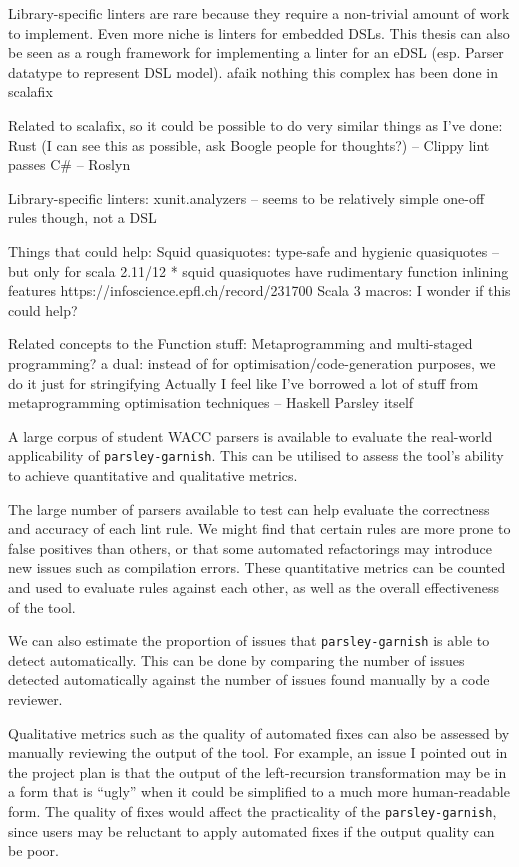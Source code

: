 \documentclass[../../main.tex]{subfiles}
\begin{document}
Library-specific linters are rare because they require a non-trivial amount of work to implement.
Even more niche is linters for embedded DSLs.
This thesis can also be seen as a rough framework for implementing a linter for an eDSL (esp. Parser datatype to represent DSL model).
afaik nothing this complex has been done in scalafix

Related to scalafix, so it could be possible to do very similar things as I've done:
Rust (I can see this as possible, ask Boogle people for thoughts?) -- Clippy lint passes %
C\# -- Roslyn

Library-specific linters:
xunit.analyzers -- seems to be relatively simple one-off rules though, not a DSL

Things that could help:
Squid quasiquotes: type-safe and hygienic quasiquotes -- but only for scala 2.11/12
* squid quasiquotes have rudimentary function inlining features https://infoscience.epfl.ch/record/231700
Scala 3 macros: I wonder if this could help?

Related concepts to the Function stuff:
Metaprogramming and multi-staged programming? a dual: instead of for optimisation/code-generation purposes, we do it just for stringifying
Actually I feel like I've borrowed a lot of stuff from metaprogramming optimisation techniques -- Haskell Parsley itself


A large corpus of student WACC parsers is available to evaluate the real-world applicability of \texttt{parsley-garnish}.
This can be utilised to assess the tool's ability to achieve quantitative and qualitative metrics.

The large number of parsers available to test can help evaluate the correctness and accuracy of each lint rule.
We might find that certain rules are more prone to false positives than others, or that some automated refactorings may introduce new issues such as compilation errors.
These quantitative metrics can be counted and used to evaluate rules against each other, as well as the overall effectiveness of the tool.

We can also estimate the proportion of issues that \texttt{parsley-garnish} is able to detect automatically.
This can be done by comparing the number of issues detected automatically against the number of issues found manually by a code reviewer.

Qualitative metrics such as the quality of automated fixes can also be assessed by manually reviewing the output of the tool.
For example, an issue I pointed out in the project plan is that the output of the left-recursion transformation may be in a form that is ``ugly'' when it could be simplified to a much more human-readable form.
The quality of fixes would affect the practicality of the \texttt{parsley-garnish}, since users may be reluctant to apply automated fixes if the output quality can be poor.
\end{document}
